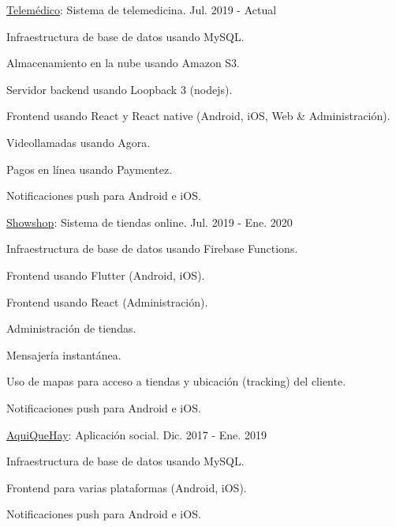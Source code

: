 \begin{cventries}
  \cventry
    {\href{https://telemedico.com.ec/}{Telemédico}: Sistema de telemedicina.} %
    {} %
    {} %
    {Jul. 2019 - Actual} %
    {
      \begin{cvitems} %
        \item {Infraestructura de base de datos usando MySQL.}
        \item {Almacenamiento en la nube usando Amazon S3.}
        \item {Servidor backend usando Loopback 3 (nodejs).}
        \item {Frontend usando React y React native (Android, iOS, Web \& Administración).}
        \item {Videollamadas usando Agora.}
        \item {Pagos en línea usando Paymentez.}
        \item {Notificaciones push para Android e iOS.}
      \end{cvitems}
    }

  \cventry
    {\href{https://showshop.app/}{Showshop}: Sistema de tiendas online.} %
    {} %
    {} %
    {Jul. 2019 - Ene. 2020} %
    {
      \begin{cvitems} %
        \item {Infraestructura de base de datos usando Firebase Functions.}
        \item {Frontend usando Flutter (Android, iOS).}
        \item {Frontend usando React (Administración).}
        \item {Administración de tiendas.}
        \item {Mensajería instantánea.}
        \item {Uso de mapas para acceso a tiendas y ubicación (tracking) del cliente.}
        \item {Notificaciones push para Android e iOS.}
      \end{cvitems}
    }

  \cventry
    {\href{https://aquiquehay.com.ec/}{AquiQueHay}: Aplicación social.} %
    {} %
    {} %
    {Dic. 2017 - Ene. 2019} %
    {
      \begin{cvitems} %
        \item {Infraestructura de base de datos usando MySQL.}
        \item {Frontend para varias plataformas (Android, iOS).}
        \item {Notificaciones push para Android e iOS.}
      \end{cvitems}
    }


\end{cventries}
